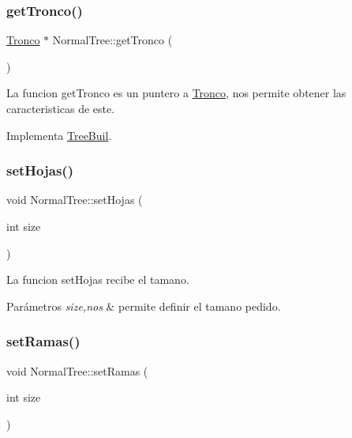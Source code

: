 \subsubsection{\texorpdfstring{get\+Tronco()}{getTronco()}}
{\footnotesize\ttfamily \hyperlink{classTronco}{Tronco} $\ast$ Normal\+Tree\+::get\+Tronco (\begin{DoxyParamCaption}{ }\end{DoxyParamCaption})\hspace{0.3cm}{\ttfamily [virtual]}}

La funcion get\+Tronco es un puntero a \hyperlink{classTronco}{Tronco}, nos permite obtener las caracteristicas de este. 

Implementa \hyperlink{classTreeBuil_a083d65b3e44e233b9a2a9305bcdabb8c}{Tree\+Buil}.

\mbox{\label{classNormalTree_a45a0b24a56264362ff1ab0ffa7843f2b}} 
\subsubsection{\texorpdfstring{set\+Hojas()}{setHojas()}}
{\footnotesize\ttfamily void Normal\+Tree\+::set\+Hojas (\begin{DoxyParamCaption}\item[{int}]{size }\end{DoxyParamCaption})}

La funcion set\+Hojas recibe el tamano. 
\begin{DoxyParams}{Parámetros}
{\em size,nos} & permite definir el tamano pedido. \\
\hline
\end{DoxyParams}
\mbox{\label{classNormalTree_aecf407fc3390d3011effea2f8dea464b}} 
\subsubsection{\texorpdfstring{set\+Ramas()}{setRamas()}}
{\footnotesize\ttfamily void Normal\+Tree\+::set\+Ramas (\begin{DoxyParamCaption}\item[{int}]{size }\end{DoxyParamCaption})}

